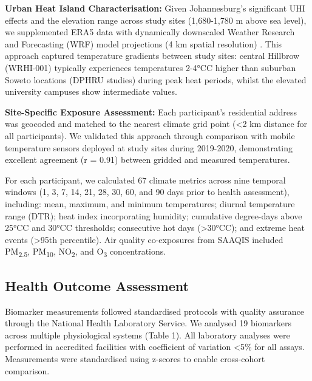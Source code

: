 \documentclass[11pt,a4paper]{article}
\newcommand{\degrees}{°C}
\begin{document}
\textbf{Urban Heat Island Characterisation:} Given Johannesburg's significant UHI effects and the elevation range across study sites (1,680-1,780 m above sea level), we supplemented ERA5 data with dynamically downscaled Weather Research and Forecasting (WRF) model projections (4 km spatial resolution) \citep{Skamarock2019}. This approach captured temperature gradients between study sites: central Hillbrow (WRHI-001) typically experiences temperatures 2-4\degrees C higher than suburban Soweto locations (DPHRU studies) during peak heat periods, whilst the elevated university campuses show intermediate values.

\textbf{Site-Specific Exposure Assessment:} Each participant's residential address was geocoded and matched to the nearest climate grid point (<2 km distance for all participants). We validated this approach through comparison with mobile temperature sensors deployed at study sites during 2019-2020, demonstrating excellent agreement (r = 0.91) between gridded and measured temperatures.

For each participant, we calculated 67 climate metrics across nine temporal windows (1, 3, 7, 14, 21, 28, 30, 60, and 90 days prior to health assessment), including: mean, maximum, and minimum temperatures; diurnal temperature range (DTR); heat index incorporating humidity; cumulative degree-days above 25\degrees C and 30\degrees C thresholds; consecutive hot days (>30\degrees C); and extreme heat events (>95th percentile). Air quality co-exposures from SAAQIS included PM\textsubscript{2.5}, PM\textsubscript{10}, NO\textsubscript{2}, and O\textsubscript{3} concentrations.

\subsection{Health Outcome Assessment}

Biomarker measurements followed standardised protocols with quality assurance through the National Health Laboratory Service. We analysed 19 biomarkers across multiple physiological systems (Table 1). All laboratory analyses were performed in accredited facilities with coefficient of variation <5\% for all assays. Measurements were standardised using z-scores to enable cross-cohort comparison.
\end{document}
